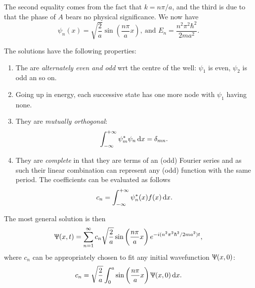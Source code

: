 The second equality comes from the fact that $k=n\pi/a$, and the third is due to that the phase of $A$ bears no physical significance. We now have
\begin{equation}
\label{pibsol}
\psi_n(x)=\sqrt{\frac{2}{a}}\sin\left(\frac{n\pi}{a}x\right),\ \text{and }E_n=\frac{n^2\pi^2\hbar^2}{2ma^2}. 
\end{equation}
\begin{prt}
The solutions have the following properties:
\begin{enumerate}
\item The are \textit{alternately even and odd} wrt the centre of the well: $\psi_1$ is even, $\psi_2$ is odd an so on.
\item Going up in energy, each successive state has one more node with $\psi_1$ having none.
\item They are \textit{mutually orthogonal}:
\begin{equation}
\intinf\psi_m^*\psi_n\dx=\delta_{mn}. 
\end{equation}
\item They are \textit{complete} in that they are terms of an (odd) Fourier series and as such their linear combination can represent any (odd) function with the same period. The coefficients can be evaluated as follows
\begin{equation}
c_n=\intinf\psi_n^*(x)f(x)\dx.
\end{equation}
\end{enumerate}
\end{prt}
The most general solution is then 
\begin{equation}
\Uppsi(x,t)=\sum^{\infty}_{n=1}c_n\sqrt{\frac{2}{a}}\sin\left(\frac{n\pi}{a}x\right)e^{-i(n^2\pi^2\hbar^2/2ma^2)t}, 
\end{equation}
where $c_n$ can be appropriately chosen to fit any initial wavefunction $\Uppsi(x,0)$:
\begin{equation}
c_n=\sqrt{\frac{2}{a}}\int^a_0\sin\left(\frac{n\pi}{a}x\right)\ups(x,0)\dx.
\end{equation}
